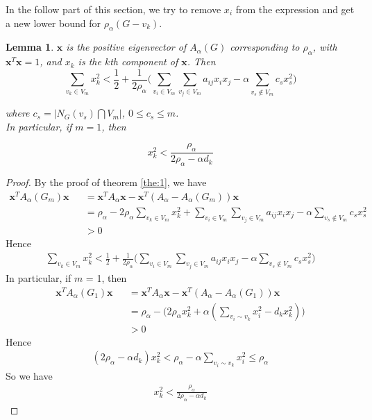 \documentclass[amsthm]{elsart}
\newtheorem{lemma}{Lemma}[section]
\begin{document}
In the follow part of this section, we try to remove $x_i$ from the expression and get a new lower bound for $\rho _\alpha(G-v_k)$.

\begin{lemma}
$\textbf{x}$ is the positive eigenvector of $A_\alpha (G)$ corresponding to $\rho _\alpha$, with $\textbf{x}^T \textbf{x} = 1$, and $x_k$ is the $k$th component of $\textbf{x}$. Then
\begin{equation} \label{equ:11}
\sum \limits_{v_k \in V_m}^{} x_k^2
< \frac{1}{2} + \frac{1}{2 \rho_\alpha} \Big( \sum \limits_{v_i \in V_m}^{} \sum \limits_{v_j \in V_m}^{} a_{ij} x_i x_j - \alpha \sum \limits_{v_s \notin V_m}^{} c_s x_s^2 \Big)
\end{equation}

where $ c_s = |N_G(v_s) \bigcap V_m|$,  $0\leqslant c_s \leqslant m$.
\\ In particular, if $m = 1$, then

\begin{equation} \label{equ:12}
 x_k^2 < \frac{\rho_\alpha}{2 \rho_\alpha - \alpha d_k}
\end{equation}
\end{lemma}
\begin{proof}
By the proof of theorem \ref{the:1}, we have
\begin{eqnarray*}
\textbf{x}^T A_\alpha(G_m) \textbf{x}
&&= \textbf{x}^T A_\alpha \textbf{x} - \textbf{x}^T(A_\alpha - A_\alpha(G_m))\textbf{x}
\\ &&= \rho_\alpha
   - 2 \rho_\alpha \sum \limits_{v_k \in V_m}^{} x_k^2
   + \sum \limits_{v_i \in V_m}^{} \sum \limits_{v_j \in V_m}^{} a_{ij} x_i x_j
   - \alpha \sum \limits_{v_s \notin V_m}^{} c_s x_s^2
\\ &&> 0
\end{eqnarray*}
Hence
\begin{eqnarray*}
\sum \limits_{v_k \in V_m}^{} x_k^2
< \frac{1}{2} + \frac{1}{2 \rho_\alpha} \Big( \sum \limits_{v_i \in V_m}^{} \sum \limits_{v_j \in V_m}^{} a_{ij} x_i x_j - \alpha \sum \limits_{v_s \notin V_m}^{} c_s x_s^2 \Big)
\end{eqnarray*}
In particular, if $m$ = 1, then
\begin{eqnarray*}
\textbf{x}^T A_\alpha(G_1) \textbf{x}
&&= \textbf{x}^T A_\alpha \textbf{x} - \textbf{x}^T(A_\alpha - A_\alpha(G_1))\textbf{x}
\\ &&= \rho_\alpha - \Big( 2 \rho_\alpha x_k^2 + \alpha (\sum \limits_{v_i \sim v_k}^{} x_i^2 - d_k x_k^2 )\Big)
\\ &&> 0
\end{eqnarray*}
Hence
\begin{eqnarray*}
(2 \rho_\alpha - \alpha d_k ) x_k^2
< \rho_\alpha - \alpha \sum \limits_{v_i \sim v_k}^{} x_i^2
\leqslant \rho_\alpha
\end{eqnarray*}
So we have
\begin{eqnarray*}
x_k^2 < \frac{\rho_\alpha} {2 \rho_\alpha - \alpha d_k}
\end{eqnarray*}
\end{proof}
\end{document}

